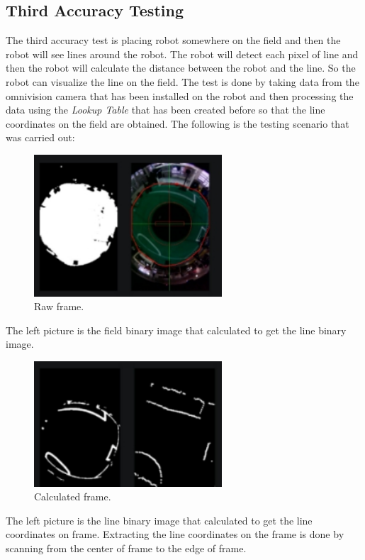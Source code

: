 \subsection{Third Accuracy Testing}
\label{sec:skenariopengujian3}

The third accuracy test is placing robot somewhere on the field and then the robot will see lines around the robot. The robot will detect each pixel of line and then the robot will calculate the distance between the robot and the line. So the robot can visualize the line on the field. The test is done by taking data from the omnivision camera that has been installed on the robot and then processing the data using the \emph{Lookup Table} that has been created before so that the line coordinates on the field are obtained. The following is the testing scenario that was carried out: 

\begin{figure}[htbp]
  \centering
  \includegraphics[width=7cm]{gambar/cam_raw1.jpg}
  \caption{Raw frame.}
  \label{fig:skenariopengujian31}
\end{figure}

The left picture is the field binary image that calculated to get the line binary image. 

\begin{figure}[htbp]
  \centering
  \includegraphics[width=7cm]{gambar/cam_raw2.jpg}
  \caption{Calculated frame.}
  \label{fig:skenariopengujian32}
\end{figure}

The left picture is the line binary image that calculated to get the line coordinates on frame. Extracting the line coordinates on the frame is done by scanning from the center of frame to the edge of frame.  

